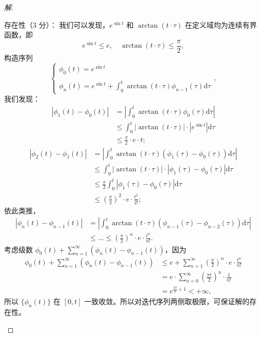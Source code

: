 \begin{proof}[解]
\begin{enumerate}[label=(\arabic*)]
存在性（3 分）：
我们可以发现，$e^{\sin t}$ 和 $\arctan (t \cdot \tau)$ 在定义域均为连续有界函数，即
\[e^{\sin t} \leq e, \quad \arctan (t \cdot \tau) \leq \frac{\pi}{2},\]
构造序列
\[\begin{cases}\phi_{0}(t)=e^{\sin t} \\ \\ 
\displaystyle\phi_{n}(t)=e^{\sin t}+\int_{0}^{t} \arctan (t \cdot \tau) \phi_{n-1}(\tau) \mathrm{d} \tau\end{cases},\]
我们发现：
\begin{align*}
|\phi_{1}(t)-\phi_{0}(t)|&=\left|\int_{0}^{t} \arctan (t \cdot \tau) \phi_{0}(\tau) \mathrm{d}\tau\right| \\
&\leq \int_{0}^{t}|\arctan (t \cdot \tau)| \cdot |e^{\sin t}| \mathrm{d}\tau \\
&\leq \frac{\pi}{2} \cdot e \cdot t;
\end{align*}
\begin{align*}
|\phi_{2}(t)-\phi_{1}(t)|&=\left|\int_{0}^{t} \arctan (t\cdot\tau)(\phi_{1}(\tau)-\phi_{0}(\tau))\mathrm{d} \tau\right| \\
&\leq \int_{0}^{t}|\arctan (t\cdot\tau)| \cdot |\phi_{1}(\tau)-\phi_{0}(\tau)|\mathrm{d}\tau \\
&\leq \frac{\pi}{2} \int_{0}^{t}|\phi_{1}(\tau)-\phi_{0}(\tau)|\mathrm{d}\tau \\
&\leq \left(\frac{\pi}{2}\right)^{2} \cdot e \cdot \frac{t^{2}}{2!};
\end{align*}
依此类推，
\begin{align*}
|\phi_{n}(t)-\phi_{n-1}(t)|&=\left|\int_{0}^{t} \arctan (t \cdot \tau)(\phi_{n-1}(\tau)-\phi_{n-2}(\tau)) \mathrm{d}\tau\right| \\
&\leq \ldots \leq\left(\frac{\pi}{2}\right)^{n} \cdot e \cdot \frac{t^{n}}{n!}.
\end{align*}
考虑级数 $\displaystyle\phi_{0}(t)+\sum_{n=1}^{\infty}(\phi_{n}(t)-\phi_{n-1}(t))$，因为
\begin{align*}
\phi_{0}(t)+\sum_{n=1}^{\infty}(\phi_{n}(t)-\phi_{n-1}(t)) 
&\leq e+\sum_{n=1}^{\infty}\left(\frac{\pi}{2}\right)^{n} \cdot e \cdot \frac{t^{n}}{n!}\\
&=e \cdot \sum_{n=0}^{\infty}\left(\frac{\pi t}{2}\right)^{n} \cdot \frac{1}{n!}\\
&=e^{\frac{\pi t}{2}+1}<+\infty,
\end{align*}
所以 $\{\phi_{n}(t)\}$ 在 $[0,t]$ 一致收敛。所以对迭代序列两侧取极限，可保证解的存在性。


\end{enumerate}
\end{proof}
